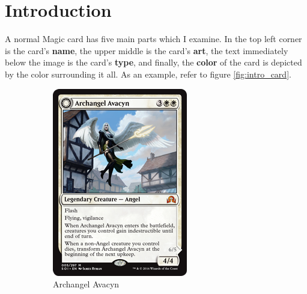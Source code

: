 \section{Introduction}
\label{sec:intro}

A normal Magic card has five main parts which I examine. In the top left corner
is the card's \textbf{name}, the upper middle is the card's \textbf{art}, 
the text immediately below the image is the card's \textbf{type}, and finally, 
the \textbf{color} of the card is depicted by the color surrounding it all. 
As an example, refer to figure \ref{fig:intro_card}.
\begin{figure}[h!]
    \centering
    \begin{subfigure}[b]{0.6\linewidth}
        \includegraphics[width=\linewidth]{figures/card.png}
        \caption{Archangel Avacyn}
    \end{subfigure}
    \begin{subfigure}[b]{0.6\linewidth}

\end{subfigure}
\end{figure}
